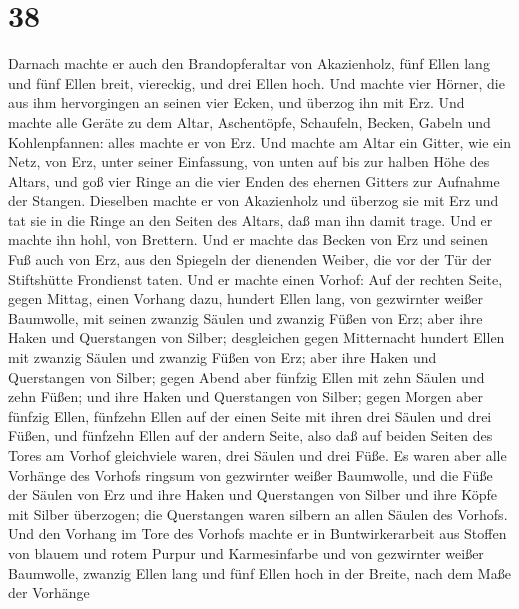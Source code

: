 \hypertarget{section-37}{%
\section{38}\label{section-37}}

 Darnach machte er auch den Brandopferaltar von
Akazienholz, fünf Ellen lang und fünf Ellen breit, viereckig, und drei
Ellen hoch.  Und machte vier Hörner, die aus ihm
hervorgingen an seinen vier Ecken, und überzog ihn mit Erz.
 Und machte alle Geräte zu dem Altar, Aschentöpfe,
Schaufeln, Becken, Gabeln und Kohlenpfannen: alles machte er von Erz.
 Und machte am Altar ein Gitter, wie ein Netz, von Erz,
unter seiner Einfassung, von unten auf bis zur halben Höhe des Altars,
 und goß vier Ringe an die vier Enden des ehernen Gitters
zur Aufnahme der Stangen.  Dieselben machte er von
Akazienholz und überzog sie mit Erz  und tat sie in die
Ringe an den Seiten des Altars, daß man ihn damit trage. Und er machte
ihn hohl, von Brettern.  Und er machte das Becken von Erz
und seinen Fuß auch von Erz, aus den Spiegeln der dienenden Weiber, die
vor der Tür der Stiftshütte Frondienst taten.  Und er
machte einen Vorhof: Auf der rechten Seite, gegen Mittag, einen Vorhang
dazu, hundert Ellen lang, von gezwirnter weißer Baumwolle,
 mit seinen zwanzig Säulen und zwanzig Füßen von Erz;
aber ihre Haken und Querstangen von Silber;  desgleichen
gegen Mitternacht hundert Ellen mit zwanzig Säulen und zwanzig Füßen von
Erz; aber ihre Haken und Querstangen von Silber;  gegen
Abend aber fünfzig Ellen mit zehn Säulen und zehn Füßen; und ihre Haken
und Querstangen von Silber;  gegen Morgen aber fünfzig
Ellen,  fünfzehn Ellen auf der einen Seite mit ihren drei
Säulen und drei Füßen,  und fünfzehn Ellen auf der andern
Seite, also daß auf beiden Seiten des Tores am Vorhof gleichviele waren,
drei Säulen und drei Füße.  Es waren aber alle Vorhänge
des Vorhofs ringsum von gezwirnter weißer Baumwolle,  und
die Füße der Säulen von Erz und ihre Haken und Querstangen von Silber
und ihre Köpfe mit Silber überzogen; die Querstangen waren silbern an
allen Säulen des Vorhofs.  Und den Vorhang im Tore des
Vorhofs machte er in Buntwirkerarbeit aus Stoffen von blauem und rotem
Purpur und Karmesinfarbe und von gezwirnter weißer Baumwolle, zwanzig
Ellen lang und fünf Ellen hoch in der Breite, nach dem Maße der Vorhänge
